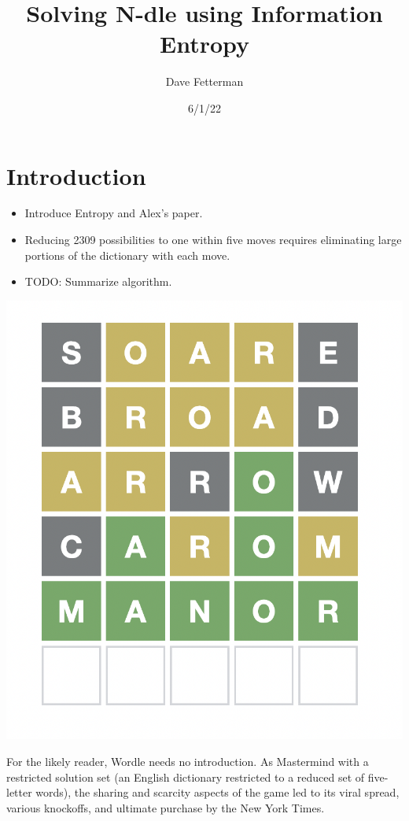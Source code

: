 \documentclass[11pt, oneside]{article}   	%
\title{Solving N-dle using Information Entropy}
\author{Dave Fetterman}
\date{6/1/22}							%
\begin{document}
\maketitle
\section{Introduction}

\begin{itemize}
\item Introduce Entropy and Alex's paper.  
\item Reducing 2309 possibilities to one within five moves requires eliminating large portions of the dictionary with each move. 
\item  TODO: Summarize algorithm.
\end{itemize}

\includegraphics[scale=.5]{wordle}

  For the likely reader, Wordle needs no introduction. As Mastermind with a restricted solution set (an English dictionary restricted to a reduced set of five-letter words), the sharing and scarcity aspects of the game led to its viral spread, various knockoffs, and ultimate purchase by the New York Times.
  
\end{document}
